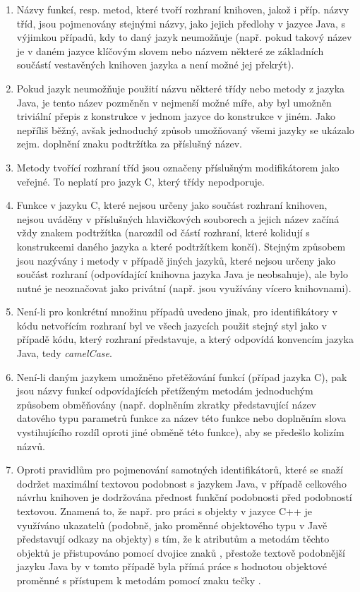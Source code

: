 \documentclass[onepage, a4paper, 12pt]{bakalarka}
\begin{document}
\begin{enumerate}
\item{Názvy funkcí, resp. metod, které tvoří rozhraní knihoven, jakož i příp. názvy tříd, jsou pojmenovány stejnými názvy, jako jejich předlohy v jazyce Java, s výjimkou případů, kdy to daný jazyk neumožňuje (např. pokud takový název je v daném jazyce klíčovým slovem nebo názvem některé ze základních součástí vestavěných knihoven jazyka a není možné jej překrýt).}
\item{Pokud jazyk neumožňuje použití názvu některé třídy nebo metody z jazyka Java, je tento název pozměněn v nejmenší možné míře, aby byl umožněn triviální přepis z konstrukce v jednom jazyce do konstrukce v jiném. Jako nepříliš běžný, avšak jednoduchý způsob umožňovaný všemi jazyky se ukázalo zejm. doplnění znaku podtržítka \uv{\_} za příslušný název.}
\item{Metody tvořící rozhraní tříd jsou označeny příslušným modifikátorem jako veřejné. To neplatí pro jazyk C, který třídy nepodporuje.}
\item{Funkce v jazyku C, které nejsou určeny jako součást rozhraní knihoven, nejsou uváděny v příslušných hlavičkových souborech a jejich název začíná vždy znakem podtržítka (narozdíl od částí rozhraní, které kolidují s konstrukcemi daného jazyka a které podtržítkem končí). Stejným způsobem jsou nazývány i metody v případě jiných jazyků, které nejsou určeny jako součást rozhraní (odpovídající knihovna jazyka Java je neobsahuje), ale bylo nutné je neoznačovat jako privátní (např. jsou využívány vícero knihovnami).}
\item{Není-li pro konkrétní množinu případů uvedeno jinak, pro identifikátory v kódu netvořícím rozhraní byl ve všech jazycích použit stejný styl jako v případě kódu, který rozhraní představuje, a který odpovídá konvencím jazyka Java, tedy \textit{camelCase}.}
\item{Není-li daným jazykem umožněno přetěžování funkcí (případ jazyka C), pak jsou názvy funkcí odpovídajících přetíženým metodám jednoduchým způsobem obměňovány (např. doplněním zkratky představující název datového typu parametrů funkce za název této funkce nebo doplněním slova vystihujícího rozdíl oproti jiné obměně této funkce), aby se předešlo kolizím názvů.}
\item{Oproti pravidlům pro pojmenování samotných identifikátorů, které se snaží dodržet maximální textovou podobnost s jazykem Java, v případě celkového návrhu knihoven je dodržována přednost funkční podobnosti před podobností textovou. Znamená to, že např. pro práci s objekty v jazyce C++ je využíváno ukazatelů (podobně, jako proměnné objektového typu v Javě představují odkazy na objekty) s tím, že k atributům a metodám těchto objektů je přistupováno pomocí dvojice znaků \uv{->}, přestože textově podobnější jazyku Java by v tomto případě byla přímá práce s hodnotou objektové proměnné s přístupem k metodám pomocí znaku tečky .}

\end{enumerate}
\end{document}
